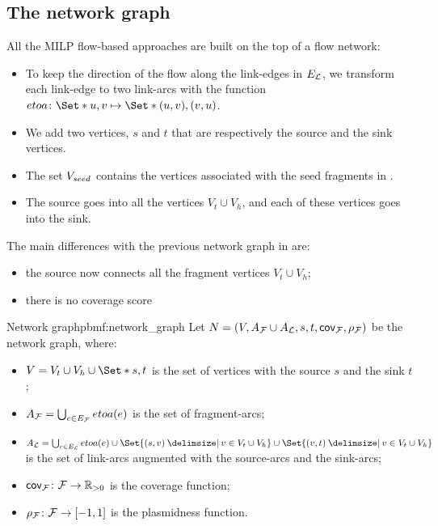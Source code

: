 \subsection{The network graph}\label{sec:pbmf:network}

All the MILP flow-based approaches are built on the top of a flow network:

\begin{itemize}
  \item To keep the direction of the flow along the link-edges in \(E_{\mathcal{L}}{}\), we transform each link-edge to two link-arcs with the function \(etoa \colon \Set*{u, v} \mapsto \Set*{(u, v), (v, u)}\).
  \item We add two vertices, \(s\) and \(t\) that are respectively the source and the sink vertices.
  \item The set \(V_{seed}{}\) contains the vertices associated with the seed fragments in \SeedFrags{}.
  \item The source goes into all the vertices \(V_t \cup V_h\), and each of these vertices goes into the sink.
\end{itemize}

The main differences with the previous network graph in  are:
\begin{itemize}
  \item the source now connects all the fragment vertices \(V_t \cup V_h\);
  \item there is no coverage score
\end{itemize}

\begin{definition}{Network graph}{pbmf:network_graph}
  Let \(N = (V, A_{\mathcal{F}}{} \cup A_{\mathcal{L}}{}, s, t, \mathsf{cov}_{\mathcal{F}{}}, \rho_{\mathcal{F}{}})\) be the network graph, where:

  \begin{itemize}
    \item \( V = V_t \cup V_h \cup \Set*{s, t} \) is the set of vertices with the source \(s\) and the sink \(t\);
    \item \( A_{\mathcal{F}}{} = \bigcup_{e \in E_{\mathcal{F}}{}} etoa(e) \) is the set of fragment-arcs;
    \item \( A_\Links{} = \bigcup_{e \in E_\Links{}} etoa(e) \cup \Set{(s, v) \given v \in V_t \cup V_h} \cup \Set{(v, t) \given v \in V_t \cup V_h} \) is the set of link-arcs augmented with the source-arcs and the sink-arcs;
    \item \( \mathsf{cov}_{\mathcal{F}{}} \colon \mathcal{F}{} \to \mathbb{R}{}_{> 0} \) is the coverage function;
    \item \( \rho_{\mathcal{F}{}} \colon \mathcal{F}{} \to [-1, 1] \) is the plasmidness function.
  \end{itemize}
\end{definition}
